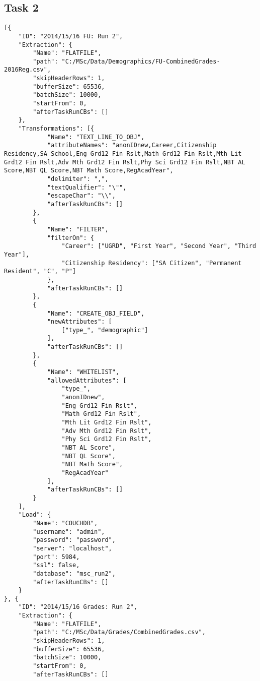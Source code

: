 \subsection{Task 2}
\label{netl-task2-config}
\begin{verbatim}
[{
    "ID": "2014/15/16 FU: Run 2",
    "Extraction": {
        "Name": "FLATFILE",
        "path": "C:/MSc/Data/Demographics/FU-CombinedGrades-2016Reg.csv",
        "skipHeaderRows": 1,
        "bufferSize": 65536,
        "batchSize": 10000,
        "startFrom": 0,
        "afterTaskRunCBs": []
    },
    "Transformations": [{
            "Name": "TEXT_LINE_TO_OBJ",
            "attributeNames": "anonIDnew,Career,Citizenship Residency,SA School,Eng Grd12 Fin Rslt,Math Grd12 Fin Rslt,Mth Lit Grd12 Fin Rslt,Adv Mth Grd12 Fin Rslt,Phy Sci Grd12 Fin Rslt,NBT AL Score,NBT QL Score,NBT Math Score,RegAcadYear",
            "delimiter": ",",
            "textQualifier": "\"",
            "escapeChar": "\\",
            "afterTaskRunCBs": []
        },
        {
            "Name": "FILTER",
            "filterOn": {
                "Career": ["UGRD", "First Year", "Second Year", "Third Year"],
                "Citizenship Residency": ["SA Citizen", "Permanent Resident", "C", "P"]
            },
            "afterTaskRunCBs": []
        },
        {
            "Name": "CREATE_OBJ_FIELD",
            "newAttributes": [
                ["type_", "demographic"]
            ],
            "afterTaskRunCBs": []
        },
        {
            "Name": "WHITELIST",
            "allowedAttributes": [
                "type_",
                "anonIDnew",
                "Eng Grd12 Fin Rslt",
                "Math Grd12 Fin Rslt",
                "Mth Lit Grd12 Fin Rslt",
                "Adv Mth Grd12 Fin Rslt",
                "Phy Sci Grd12 Fin Rslt",
                "NBT AL Score",
                "NBT QL Score",
                "NBT Math Score",
                "RegAcadYear"
            ],
            "afterTaskRunCBs": []
        }
    ],
    "Load": {
        "Name": "COUCHDB",
        "username": "admin",
        "password": "password",
        "server": "localhost",
        "port": 5984,
        "ssl": false,
        "database": "msc_run2",
        "afterTaskRunCBs": []
    }
}, {
    "ID": "2014/15/16 Grades: Run 2",
    "Extraction": {
        "Name": "FLATFILE",
        "path": "C:/MSc/Data/Grades/CombinedGrades.csv",
        "skipHeaderRows": 1,
        "bufferSize": 65536,
        "batchSize": 10000,
        "startFrom": 0,
        "afterTaskRunCBs": []

\end{verbatim}
